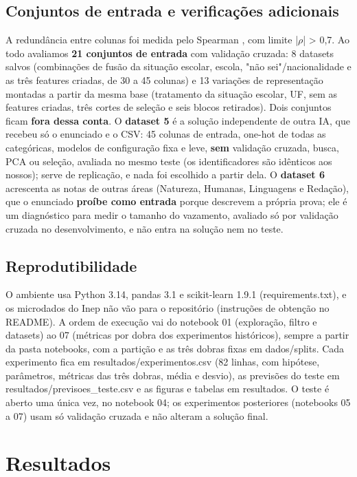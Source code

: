 \documentclass[conference,a4paper]{IEEEtran}
\begin{document}
\subsection{Conjuntos de entrada e verificações adicionais}
A redundância entre colunas foi medida pelo Spearman \cite{spearman}, com limite |$\rho$| > 0,7. Ao todo avaliamos \textbf{21 conjuntos de entrada} com validação cruzada: 8 datasets salvos (combinações de fusão da situação escolar, escola, "não sei"/nacionalidade e as três features criadas, de 30 a 45 colunas) e 13 variações de representação montadas a partir da mesma base (tratamento da situação escolar, UF, sem as features criadas, três cortes de seleção e seis blocos retirados). Dois conjuntos ficam \textbf{fora dessa conta}. O \textbf{dataset 5} é a solução independente de outra IA, que recebeu só o enunciado e o CSV: 45 colunas de entrada, one-hot de todas as categóricas, modelos de configuração fixa e leve, \textbf{sem} validação cruzada, busca, PCA ou seleção, avaliada no mesmo teste (os identificadores são idênticos aos nossos); serve de replicação, e nada foi escolhido a partir dela. O \textbf{dataset 6} acrescenta as notas de outras áreas (Natureza, Humanas, Linguagens e Redação), que o enunciado \textbf{proíbe como entrada} porque descrevem a própria prova; ele é um diagnóstico para medir o tamanho do vazamento, avaliado só por validação cruzada no desenvolvimento, e não entra na solução nem no teste.


\subsection{Reprodutibilidade}
O ambiente usa Python 3.14, pandas 3.1 e scikit-learn 1.9.1 (requirements.txt), e os microdados do Inep não vão para o repositório (instruções de obtenção no README). A ordem de execução vai do notebook 01 (exploração, filtro e datasets) ao 07 (métricas por dobra dos experimentos históricos), sempre a partir da pasta notebooks, com a partição e as três dobras fixas em dados/splits. Cada experimento fica em resultados/experimentos.csv (82 linhas, com hipótese, parâmetros, métricas das três dobras, média e desvio), as previsões do teste em resultados/previsoes\_teste.csv e as figuras e tabelas em resultados. O teste é aberto uma única vez, no notebook 04; os experimentos posteriores (notebooks 05 a 07) usam só validação cruzada e não alteram a solução final.


\section{Resultados}
\end{document}
